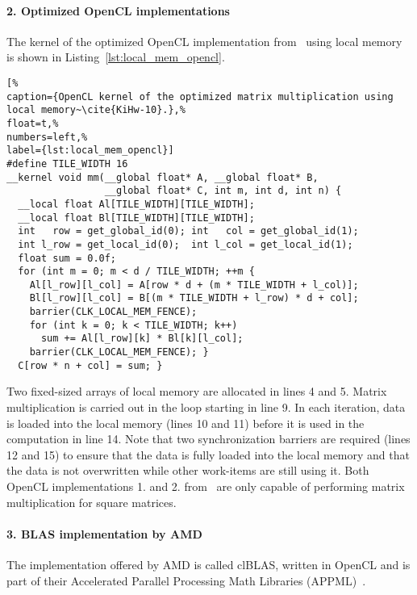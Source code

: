 \vspace{-.5em}
\paragraph{2. Optimized OpenCL implementations}
The kernel of the optimized OpenCL implementation from~\cite{KiHw-10} using local memory is shown in Listing~\ref{lst:local_mem_opencl}.
\begin{lstlisting}[%                                                             
caption={OpenCL kernel of the optimized matrix multiplication using local memory~\cite{KiHw-10}.},%
float=t,%
numbers=left,%
label={lst:local_mem_opencl}]
#define TILE_WIDTH 16
__kernel void mm(__global float* A, __global float* B,
                 __global float* C, int m, int d, int n) {
  __local float Al[TILE_WIDTH][TILE_WIDTH];
  __local float Bl[TILE_WIDTH][TILE_WIDTH];
  int   row = get_global_id(0); int   col = get_global_id(1);
  int l_row = get_local_id(0);  int l_col = get_local_id(1);
  float sum = 0.0f;
  for (int m = 0; m < d / TILE_WIDTH; ++m {
    Al[l_row][l_col] = A[row * d + (m * TILE_WIDTH + l_col)];
    Bl[l_row][l_col] = B[(m * TILE_WIDTH + l_row) * d + col];
    barrier(CLK_LOCAL_MEM_FENCE);
    for (int k = 0; k < TILE_WIDTH; k++)
      sum += Al[l_row][k] * Bl[k][l_col];
    barrier(CLK_LOCAL_MEM_FENCE); }
  C[row * n + col] = sum; }
\end{lstlisting}
Two fixed-sized arrays of local memory are allocated in lines 4 and 5.
Matrix multiplication is carried out in the loop starting in line 9.
In each iteration, data is loaded into the local memory (lines 10 and 11) before it is used in the computation in line 14.
Note that two synchronization barriers are required (lines 12 and 15) to ensure that the data is fully loaded into the local memory and that the data is not overwritten while other work-items are still using it.
Both OpenCL implementations 1. and 2. from~\cite{KiHw-10} are only capable of performing matrix multiplication for square matrices.

\vspace{-.5em}
\paragraph{3. BLAS implementation by AMD}
The implementation offered by AMD is called clBLAS, written in OpenCL and is part of their Accelerated Parallel Processing Math Libraries (APPML)~\cite{AMD-13}.

\vspace{-.5em}
